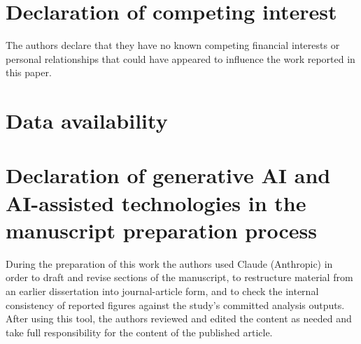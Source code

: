 \documentclass[a4paper,fleqn]{cas-sc}
\begin{document}
\section*{Declaration of competing interest}
The authors declare that they have no known competing financial interests or
personal relationships that could have appeared to influence the work reported
in this paper.

\section*{Data availability}

\section*{Declaration of generative AI and AI-assisted technologies in the
manuscript preparation process}
During the preparation of this work the authors used Claude (Anthropic) in order
to draft and revise sections of the manuscript, to restructure material from an
earlier dissertation into journal-article form, and to check the internal
consistency of reported figures against the study's committed analysis outputs.
After using this tool, the authors reviewed and edited the content as needed and
take full responsibility for the content of the published article.



\end{document}
